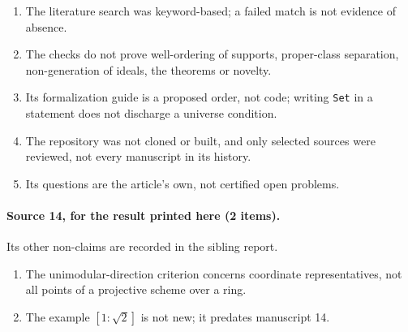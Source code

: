 \documentclass[11pt,oneside]{article}
\numberwithin{equation}{section}
\theoremstyle{definition}
\theoremstyle{remark}
\begin{document}
\begin{enumerate}[leftmargin=*,itemsep=1pt]
priority is established.
\item The literature search was keyword-based; a failed match is not evidence
of absence.
\item The checks do not prove well-ordering of supports, proper-class
separation, non-generation of ideals, the theorems or novelty.
\item Its formalization guide is a proposed order, not code; writing
\texttt{Set} in a statement does not discharge a universe condition.
\item The repository was not cloned or built, and only selected sources were
reviewed, not every manuscript in its history.
\item Its questions are the article's own, not certified open problems.
\end{enumerate}

\paragraph{Source 14, for the result printed here (2 items).} Its other
non-claims are recorded in the sibling report.
\begin{enumerate}[leftmargin=*,itemsep=1pt]
\item The unimodular-direction criterion concerns coordinate representatives,
not all points of a projective scheme over a ring.
\item The example $[1:\sqrt2]$ is not new; it predates manuscript 14.
\end{enumerate}
\end{document}
